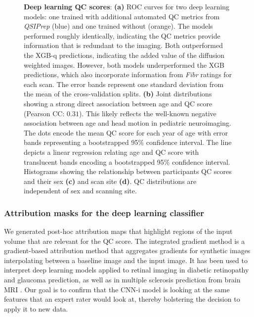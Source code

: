 \documentclass[9pt,lineno]{elife}
\begin{document}
\begin{figure}[tbp]
\begin{subfigure}{\linewidth}
    \end{subfigure}
    \caption{%
        {\bf Deep learning QC scores}:
        \textbf{(a)} ROC curves for two deep learning models: one trained with
        additional automated QC metrics from \emph{QSIPrep} (blue) and one
        trained without (orange). The models performed roughly identically,
        indicating the QC metrics provide information that is redundant to
        the imaging. Both outperformed the XGB-q predictions, indicating the
        added value of the diffusion weighted images. However, both models
        underperformed the XGB predictions, which also incorporate
        information from \emph{Fibr} ratings for each scan. The error bands
        represent one standard deviation from the mean of the cross-validation
        splits.
        \textbf{(b)} Joint distributions showing a strong direct association
        between age and QC score (Pearson CC: $0.31$). This likely reflects the well-known negative
        association between age and head motion in pediatric neuroimaging.
        The dots encode the mean QC score for each year of age with error bands
        representing a bootstrapped 95\% confidence interval. The line depicts
        a linear regression relating age and QC score with translucent bands
        encoding a bootstrapped 95\% confidence interval.
        Histograms showing the relationship between participants QC scores and
        their sex \textbf{(c)} and scan site \textbf{(d)}. QC distributions are independent
        of sex and scanning site.
    }
    \label{fig:dl-qc}
\end{figure}

\subsubsection{Attribution masks for the deep learning classifier}

We generated post-hoc attribution maps that highlight regions of the input
volume that are relevant for the QC score. The integrated gradient method
\citep{sundararajan2017axiomatic} is a gradient-based attribution method
\citep{ancona2019gradient} that aggregates gradients for synthetic images
interpolating between a baseline image and the input image. It has been used to
interpret deep learning models applied to retinal imaging in diabetic
retinopathy \citep{sayres2019using} and glaucoma \citep{Mehta2021-zp} prediction,
as well as in multiple sclerosis prediction from brain MRI
\citep{wargnier-dauchelle2021interpretable}. Our goal is to confirm that the
CNN-i model is looking at the same features that an expert rater would look at,
thereby bolstering the decision to apply it to new data.
\end{document}

